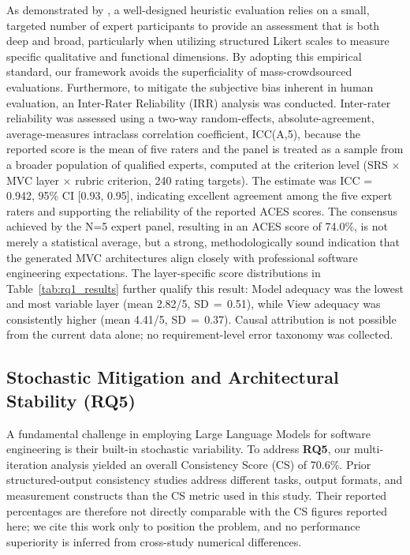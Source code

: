 As demonstrated by \citet{monasor2014walk}, a well-designed heuristic evaluation relies on a small, targeted number of expert participants to provide an assessment that is both deep and broad, particularly when utilizing structured Likert scales to measure specific qualitative and functional dimensions. By adopting this empirical standard, our framework avoids the superficiality of mass-crowdsourced evaluations. Furthermore, to mitigate the subjective bias inherent in human evaluation, an Inter-Rater Reliability (IRR) analysis was conducted. Inter-rater reliability was assessed using a two-way random-effects, absolute-agreement, average-measures intraclass correlation coefficient, ICC(A,5), because the reported score is the mean of five raters and the panel is treated as a sample from a broader population of qualified experts, computed at the criterion level (SRS $\times$ MVC layer $\times$ rubric criterion, 240 rating targets). The estimate was ICC = 0.942, 95\% CI [0.93, 0.95], indicating excellent agreement among the five expert raters and supporting the reliability of the reported ACES scores. The consensus achieved by the N=5 expert panel, resulting in an ACES score of 74.0\%, is not merely a statistical average, but a strong, methodologically sound indication that the generated MVC architectures align closely with professional software engineering expectations. The layer-specific score distributions in Table~\ref{tab:rq1_results} further qualify this result: Model adequacy was the lowest and most variable layer (mean 2.82/5, SD\,$=$\,0.51), while View adequacy was consistently higher (mean 4.41/5, SD\,$=$\,0.37). Causal attribution is not possible from the current data alone; no requirement-level error taxonomy was collected.

\subsection{Stochastic Mitigation and Architectural Stability (RQ5)}

A fundamental challenge in employing Large Language Models for software engineering is their built-in stochastic variability. To address \textbf{RQ5}, our multi-iteration analysis yielded an overall Consistency Score (CS) of 70.6\%. Prior structured-output consistency studies address different tasks, output formats, and measurement constructs than the CS metric used in this study. Their reported percentages are therefore not directly comparable with the CS figures reported here; we cite this work only to position the problem, and no performance superiority is inferred from cross-study numerical differences.

